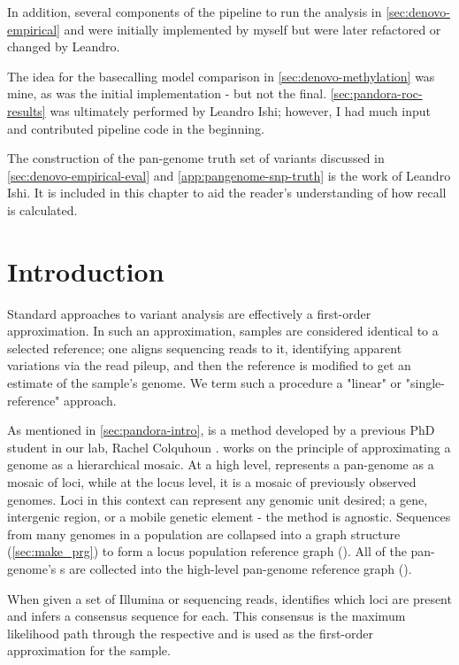 In addition, several components of the pipeline to run the analysis in \autoref{sec:denovo-empirical} and \cite{pandora} were initially implemented by myself but were later refactored or changed by Leandro.

The idea for the \ont{} basecalling model comparison in \autoref{sec:denovo-methylation} was mine, as was the initial implementation - but not the final. \autoref{sec:pandora-roc-results} was ultimately performed by Leandro Ishi; however, I had much input and contributed pipeline code in the beginning.

The construction of the pan-genome truth set of variants discussed in \autoref{sec:denovo-empirical-eval} and \autoref{app:pangenome-snp-truth} is the work of Leandro Ishi. It is included in this chapter to aid the reader's understanding of how recall is calculated.

\section{Introduction}

Standard approaches to variant analysis are effectively a first-order approximation. In such an approximation, samples are considered identical to a selected reference; one aligns sequencing reads to it, identifying apparent variations via the read pileup, and then the reference is modified to get an estimate of the sample's genome. We term such a procedure a "linear" or "single-reference" approach. 

As mentioned in \autoref{sec:pandora-intro}, \pandora{} is a method developed by a previous PhD student in our lab, Rachel Colquhoun \cite{rachelthesis}. \pandora{} works on the principle of approximating a genome as a hierarchical mosaic. At a high level, \pandora{} represents a pan-genome as a mosaic of loci, while at the locus level, it is a mosaic of previously observed genomes. Loci in this context can represent any genomic unit desired; a gene, intergenic region, or a mobile genetic element - the method is agnostic. Sequences from many genomes in a population are collapsed into a graph structure (\autoref{sec:make_prg}) to form a locus population reference graph (\prg{}). All of the pan-genome's \prg{}s are collected into the high-level pan-genome reference graph (\panrg{}).

When given a set of Illumina or \ont{} sequencing reads, \pandora{} identifies which \panrg{} loci are present and infers a consensus sequence for each. This consensus is the maximum likelihood path through the respective \prg{} and is used as the first-order approximation for the sample.

